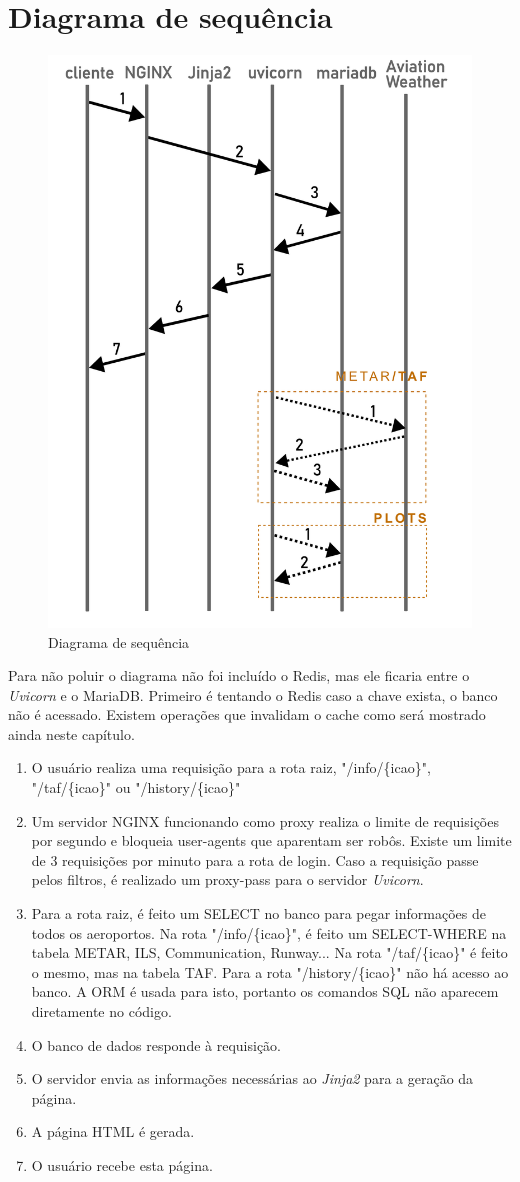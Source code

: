 \section{Diagrama de sequência}

\begin{figure}[H]
    \begin{center}
    \includegraphics[width=0.5\linewidth]{img/diagrama-tempo.png}
    \caption{Diagrama de sequência}
    \label{fig:tempo}
    \end{center}
\end{figure}

Para não poluir o diagrama não foi incluído o Redis, mas ele ficaria entre
o \textit{Uvicorn} e o MariaDB. Primeiro é tentando o Redis caso a chave exista, o banco
não é acessado. Existem operações que invalidam o cache como será mostrado
ainda neste capítulo.

\begin{enumerate}
\item O usuário realiza uma requisição para a rota raiz, "/info/\{icao\}", "/taf/\{icao\}"
ou "/history/\{icao\}"
\item Um servidor NGINX funcionando como proxy realiza o limite de requisições por segundo
e bloqueia user-agents que aparentam ser robôs. Existe um limite de 3 requisições por
minuto para a rota de login. Caso a requisição passe pelos filtros, é
realizado um proxy-pass para o servidor \textit{Uvicorn}.
\item Para a rota raiz, é feito um SELECT no banco para pegar informações de todos os
aeroportos. Na rota "/info/\{icao\}", é feito um SELECT-WHERE na tabela METAR, ILS, Communication, Runway...
Na rota "/taf/\{icao\}" é feito o mesmo, mas na tabela TAF. Para a rota "/history/\{icao\}"
não há acesso ao banco.
A ORM é usada para isto, portanto os comandos SQL não aparecem diretamente no código.
\item O banco de dados responde à requisição.
\item O servidor envia as informações necessárias ao \textit{Jinja2} para a geração da página.
\item A página HTML é gerada.
\item O usuário recebe esta página.
\end{enumerate}

